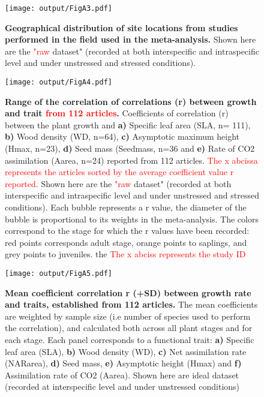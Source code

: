 \documentclass[a4paper]{article}\usepackage[]{graphicx}\usepackage[]{color}
\begin{document}
\begin{appendices}
\begin{figure}[htbp]
\centering
\texttt{[image: output/FigA3.pdf]}
\caption{\textbf{Geographical distribution of site locations from studies performed in the field used in the meta-analysis.} Shown here are the \textcolor{red}{"raw} dataset" (recorded at both interspecific and intraspecific level and under unstressed and stressed conditions).}
\label{FigA3}
\end{figure}


\begin{figure}[htbp]
\centering
\texttt{[image: output/FigA4.pdf]}
\caption{\textbf{Range of the correlation of correlations (r) between
growth and trait \textcolor{red}{from 112 articles}.} Coefficients of correlation (r)
between the plant growth and \textbf{a)} Specific leaf area (SLA, n=
111), \textbf{b)} Wood density (WD, n=64), \textbf{c)} Asymptotic
maximum height (Hmax, n=23), \textbf{d)} Seed mass (Seedmass, n=36 and
\textbf{e)} Rate of CO2 assimilation (Aarea, n=24) reported from 112
articles. \textcolor{red} {The x abcissa represents the articles sorted by the average coefficient value r reported}.
Shown here are the \textcolor{red}{"raw} dataset" (recorded at both interspecific
and intraspecific level and under unstressed and stressed conditions). Each bubble represents a r value, the diameter of the bubble
is proportional to its weights in the meta-analysis. The colors
correspond to the stage for which the r values have been recorded: red
points corresponds adult stage, orange points to saplings, and grey
points to juveniles. the \textcolor{red}{The x abciss represents the study ID} }
\label{FigA4}
\end{figure}


\begin{figure}[htbp]
\centering
\texttt{[image: output/FigA5.pdf]}
\caption{\textbf{Mean coefficient correlation r (+SD) between growth
rate and traits, established from 112 articles.} The mean
coefficients are weighted by sample size (i.e number of species used to
perform the correlation), and calculated both across all plant stages
and for each stage. Each panel corresponds to a functional trait:
\textbf{a)} Specific leaf area (SLA), \textbf{b)} Wood density (WD),
\textbf{c)} Net assimilation rate (NARarea), \textbf{d)} Seed mass,
\textbf{e)} Asymptotic height (Hmax) and \textbf{f)} Assimilation rate
of CO2 (Aarea). Shown here are ideal dataset (recorded at interspecific level and under unstressed conditions)}
\label{FigA5}
\end{figure}


\end{appendices}
\end{document}
